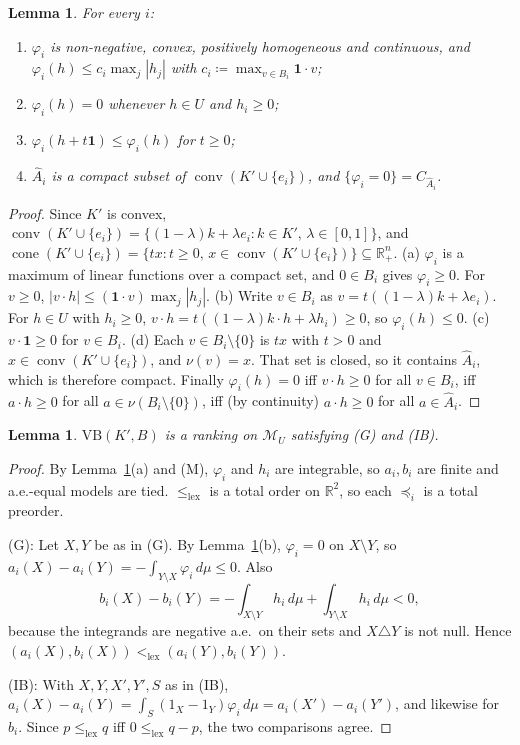 \documentclass[11pt]{article}
\newcommand{\R}{\mathbb{R}}
\newcommand{\one}{\mathbf{1}}
\newcommand{\M}{\mathcal{M}}
\newcommand{\lexle}{\le_{\mathrm{lex}}}
\newcommand{\lexlt}{<_{\mathrm{lex}}}
\newcommand{\VB}{\mathrm{VB}}
\DeclareMathOperator{\conv}{conv}
\DeclareMathOperator{\cone}{cone}
\theoremstyle{plain}
\newtheorem{lemma}[theorem]{Lemma}
\theoremstyle{definition}
\theoremstyle{remark}
\begin{document}
\begin{lemma}\label{lem:veto}
For every $i$:
\begin{enumerate}[label=(\alph*)]
  \item $\varphi_i$ is non-negative, convex, positively homogeneous and continuous, and
  $\varphi_i(h)\le c_i\max_j|h_j|$ with $c_i\coloneqq\max_{v\in B_i}\one\cdot v$;
  \item $\varphi_i(h)=0$ whenever $h\in U$ and $h_i\ge0$;
  \item $\varphi_i(h+t\one)\le\varphi_i(h)$ for $t\ge0$;
  \item $\hat A_i$ is a compact subset of $\conv(K'\cup\{e_i\})$, and
  $\{\varphi_i=0\}=C_{\hat A_i}$.
\end{enumerate}
\end{lemma}

\begin{proof}
Since $K'$ is convex, $\conv(K'\cup\{e_i\})=\{(1-\lambda)k+\lambda e_i:k\in K',\,
\lambda\in[0,1]\}$, and $\cone(K'\cup\{e_i\})=\{tx:t\ge0,\,x\in\conv(K'\cup\{e_i\})\}
\subseteq\R^n_+$.
(a) $\varphi_i$ is a maximum of linear functions over a compact set, and $0\in B_i$ gives
$\varphi_i\ge0$. For $v\ge0$, $|v\cdot h|\le(\one\cdot v)\max_j|h_j|$.
(b) Write $v\in B_i$ as $v=t((1-\lambda)k+\lambda e_i)$. For $h\in U$ with $h_i\ge0$,
$v\cdot h=t((1-\lambda)k\cdot h+\lambda h_i)\ge0$, so $\varphi_i(h)\le0$.
(c) $v\cdot\one\ge0$ for $v\in B_i$.
(d) Each $v\in B_i\setminus\{0\}$ is $tx$ with $t>0$ and $x\in\conv(K'\cup\{e_i\})$, and
$\nu(v)=x$. That set is closed, so it contains $\hat A_i$, which is therefore compact.
Finally $\varphi_i(h)=0$ iff $v\cdot h\ge0$ for all $v\in B_i$, iff $a\cdot h\ge0$ for all
$a\in\nu(B_i\setminus\{0\})$, iff (by continuity) $a\cdot h\ge0$ for all $a\in\hat A_i$.
\end{proof}

\begin{lemma}\label{lem:axioms}
$\VB(K',B)$ is a ranking on $\M_U$ satisfying (G) and (IB).
\end{lemma}

\begin{proof}
By Lemma~\ref{lem:veto}(a) and (M), $\varphi_i$ and $h_i$ are integrable, so $a_i,b_i$
are finite and a.e.-equal models are tied. $\lexle$ is a total order on $\R^2$, so each
$\preceq_i$ is a total preorder.

(G): Let $X,Y$ be as in (G). By Lemma~\ref{lem:veto}(b), $\varphi_i=0$ on $X\setminus Y$,
so $a_i(X)-a_i(Y)=-\int_{Y\setminus X}\varphi_i\,d\mu\le0$. Also
\[
  b_i(X)-b_i(Y)=-\int_{X\setminus Y}h_i\,d\mu+\int_{Y\setminus X}h_i\,d\mu<0,
\]
because the integrands are negative a.e.\ on their sets and $X\triangle Y$ is not null.
Hence $(a_i(X),b_i(X))\lexlt(a_i(Y),b_i(Y))$.

(IB): With $X,Y,X',Y',S$ as in (IB), $a_i(X)-a_i(Y)=\int_S(1_X-1_Y)\varphi_i\,d\mu=
a_i(X')-a_i(Y')$, and likewise for $b_i$. Since $p\lexle q$ iff $0\lexle q-p$, the two
comparisons agree.
\end{proof}
\end{document}
